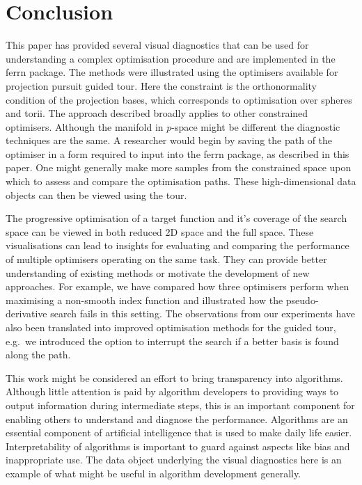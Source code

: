 \hypertarget{conclusion}{%
\section{Conclusion}\label{conclusion}}

This paper has provided several visual diagnostics that can be used for
understanding a complex optimisation procedure and are implemented in
the ferrn package. The methods were illustrated using the optimisers
available for projection pursuit guided tour. Here the constraint is the
orthonormality condition of the projection bases, which corresponds to
optimisation over spheres and torii. The approach described broadly
applies to other constrained optimisers. Although the manifold in
\(p\)-space might be different the diagnostic techniques are the same. A
researcher would begin by saving the path of the optimiser in a form
required to input into the ferrn package, as described in this paper.
One might generally make more samples from the constrained space upon
which to assess and compare the optimisation paths. These
high-dimensional data objects can then be viewed using the tour.

The progressive optimisation of a target function and it's coverage of
the search space can be viewed in both reduced 2D space and the full
space. These visualisations can lead to insights for evaluating and
comparing the performance of multiple optimisers operating on the same
task. They can provide better understanding of existing methods or
motivate the development of new approaches. For example, we have
compared how three optimisers perform when maximising a non-smooth index
function and illustrated how the pseudo-derivative search fails in this
setting. The observations from our experiments have also been translated
into improved optimisation methods for the guided tour, e.g.~we
introduced the option to interrupt the search if a better basis is found
along the path.

This work might be considered an effort to bring transparency into
algorithms. Although little attention is paid by algorithm developers to
providing ways to output information during intermediate steps, this is
an important component for enabling others to understand and diagnose
the performance. Algorithms are an essential component of artificial
intelligence that is used to make daily life easier. Interpretability of
algorithms is important to guard against aspects like bias and
inappropriate use. The data object underlying the visual diagnostics
here is an example of what might be useful in algorithm development
generally.

